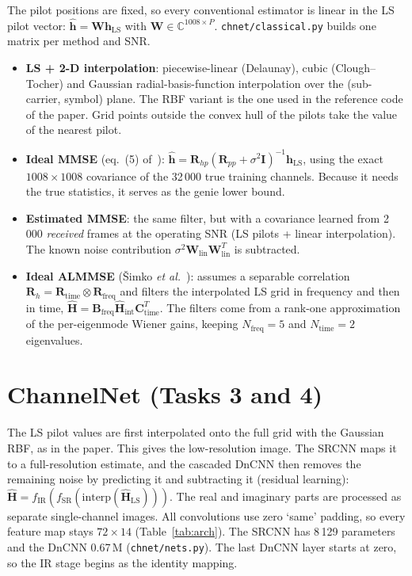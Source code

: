 \documentclass[10pt,a4paper]{article}
\newcommand{\HLS}{\mathbf{h}_{\mathrm{LS}}}
\newcommand{\code}[1]{\texttt{\small #1}}
\begin{document}
The pilot positions are fixed, so every conventional estimator is linear in the LS pilot vector:
$\hat{\mathbf h}=\mathbf W\HLS$ with $\mathbf W\in\mathbb C^{1008\times P}$. \code{chnet/classical.py}
builds one matrix per method and SNR.
\begin{itemize}
  \item \textbf{LS + 2-D interpolation}: piecewise-linear (Delaunay), cubic (Clough--Tocher) and
    Gaussian radial-basis-function interpolation over the (sub-carrier, symbol) plane. The RBF variant
    is the one used in the reference code of the paper. Grid points outside the convex hull of the
    pilots take the value of the nearest pilot.
  \item \textbf{Ideal MMSE} (eq.~(5) of~\cite{soltani}): $\hat{\mathbf h}=\mathbf R_{hp}(\mathbf R_{pp}
    +\sigma^2\mathbf I)^{-1}\HLS$, using the exact $1008\times1008$ covariance of the 32\,000 true
    training channels. Because it needs the true statistics, it serves as the genie lower bound.
  \item \textbf{Estimated MMSE}: the same filter, but with a covariance learned from 2\,000
    \emph{received} frames at the operating SNR (LS pilots + linear interpolation). The known noise
    contribution $\sigma^2\mathbf W_{\mathrm{lin}}\mathbf W_{\mathrm{lin}}^T$ is subtracted.
  \item \textbf{Ideal ALMMSE} (\v{S}imko \emph{et al.}~\cite{simko}): assumes a separable correlation
    $\mathbf R_h=\mathbf R_{\mathrm{time}}\otimes\mathbf R_{\mathrm{freq}}$ and filters the interpolated LS
    grid in frequency and then in time, $\hat{\mathbf H}=\mathbf B_{\mathrm{freq}}\hat{\mathbf
    H}_{\mathrm{int}}\mathbf C_{\mathrm{time}}^T$. The filters come from a rank-one approximation of the
    per-eigenmode Wiener gains, keeping $N_{\mathrm{freq}}=5$ and $N_{\mathrm{time}}=2$ eigenvalues.
\end{itemize}

\section{ChannelNet (Tasks 3 and 4)}

The LS pilot values are first interpolated onto the full grid with the Gaussian RBF, as in the paper.
This gives the low-resolution image. The SRCNN maps it to a full-resolution estimate, and the
cascaded DnCNN then removes the remaining noise by predicting it and subtracting it (residual
learning): $\hat{\mathbf H}=f_{\mathrm{IR}}(f_{\mathrm{SR}}(\mathrm{interp}(\hat{\mathbf H}_{\mathrm{LS}})))$.
The real and imaginary parts are processed as separate single-channel images. All convolutions use
zero `same' padding, so every feature map stays $72\times14$ (Table~\ref{tab:arch}). The SRCNN has
8\,129 parameters and the DnCNN 0.67\,M (\code{chnet/nets.py}). The last DnCNN layer starts at zero,
so the IR stage begins as the identity mapping.
\end{document}

